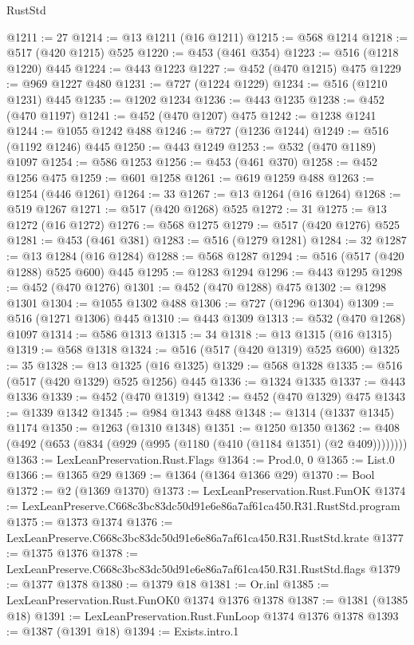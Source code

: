 \begin{lexlean}{RustStd}
\begin{coremodule}
@1211 := 27
@1214 := @13 @1211 (@16 @1211)
@1215 := @568 @1214
@1218 := @517 (@420 @1215) @525
@1220 := @453 (@461 @354)
@1223 := @516 (@1218 @1220) @445
@1224 := @443 @1223
@1227 := @452 (@470 @1215) @475
@1229 := @969 @1227 @480
@1231 := @727 (@1224 @1229)
@1234 := @516 (@1210 @1231) @445
@1235 := @1202 @1234
@1236 := @443 @1235
@1238 := @452 (@470 @1197)
@1241 := @452 (@470 @1207) @475
@1242 := @1238 @1241
@1244 := @1055 @1242 @488
@1246 := @727 (@1236 @1244)
@1249 := @516 (@1192 @1246) @445
@1250 := @443 @1249
@1253 := @532 (@470 @1189) @1097
@1254 := @586 @1253
@1256 := @453 (@461 @370)
@1258 := @452 @1256 @475
@1259 := @601 @1258
@1261 := @619 @1259 @488
@1263 := @1254 (@446 @1261)
@1264 := 33
@1267 := @13 @1264 (@16 @1264)
@1268 := @519 @1267
@1271 := @517 (@420 @1268) @525
@1272 := 31
@1275 := @13 @1272 (@16 @1272)
@1276 := @568 @1275
@1279 := @517 (@420 @1276) @525
@1281 := @453 (@461 @381)
@1283 := @516 (@1279 @1281)
@1284 := 32
@1287 := @13 @1284 (@16 @1284)
@1288 := @568 @1287
@1294 := @516 (@517 (@420 @1288) @525 @600) @445
@1295 := @1283 @1294
@1296 := @443 @1295
@1298 := @452 (@470 @1276)
@1301 := @452 (@470 @1288) @475
@1302 := @1298 @1301
@1304 := @1055 @1302 @488
@1306 := @727 (@1296 @1304)
@1309 := @516 (@1271 @1306) @445
@1310 := @443 @1309
@1313 := @532 (@470 @1268) @1097
@1314 := @586 @1313
@1315 := 34
@1318 := @13 @1315 (@16 @1315)
@1319 := @568 @1318
@1324 := @516 (@517 (@420 @1319) @525 @600)
@1325 := 35
@1328 := @13 @1325 (@16 @1325)
@1329 := @568 @1328
@1335 := @516 (@517 (@420 @1329) @525 @1256) @445
@1336 := @1324 @1335
@1337 := @443 @1336
@1339 := @452 (@470 @1319)
@1342 := @452 (@470 @1329) @475
@1343 := @1339 @1342
@1345 := @984 @1343 @488
@1348 := @1314 (@1337 @1345) @1174
@1350 := @1263 (@1310 @1348)
@1351 := @1250 @1350
@1362 := @408 (@492 (@653 (@834 (@929 (@995 (@1180 (@410 (@1184 @1351) (@2 @409))))))))
@1363 := LexLeanPreservation.Rust.Flags
@1364 := Prod.{0, 0}
@1365 := List.{0}
@1366 := @1365 @29
@1369 := @1364 (@1364 @1366 @29)
@1370 := Bool
@1372 := @2 (@1369 @1370)
@1373 := LexLeanPreservation.Rust.FunOK
@1374 := LexLeanPreserve.C668c3bc83dc50d91e6e86a7af61ca450.R31.RustStd.program
@1375 := @1373 @1374
@1376 := LexLeanPreserve.C668c3bc83dc50d91e6e86a7af61ca450.R31.RustStd.krate
@1377 := @1375 @1376
@1378 := LexLeanPreserve.C668c3bc83dc50d91e6e86a7af61ca450.R31.RustStd.flags
@1379 := @1377 @1378
@1380 := @1379 @18
@1381 := Or.inl
@1385 := LexLeanPreservation.Rust.FunOK0 @1374 @1376 @1378
@1387 := @1381 (@1385 @18)
@1391 := LexLeanPreservation.Rust.FunLoop @1374 @1376 @1378
@1393 := @1387 (@1391 @18)
@1394 := Exists.intro.{1}

\end{coremodule}
\end{lexlean}
